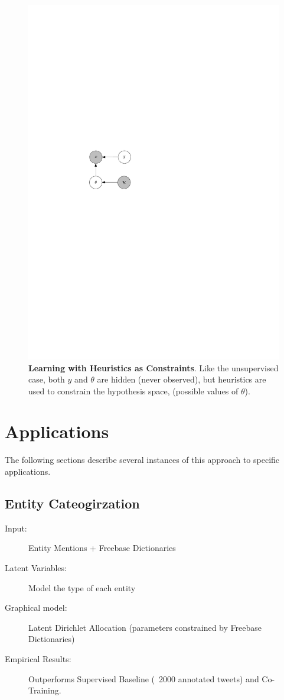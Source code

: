 \documentclass[12pt]{article}
\begin{document}
\begin{figure}
  \centering
  \includegraphics{dlvm_train.pdf}
  \caption{{\bf Learning with Heuristics as Constraints}.  Like the unsupervised case, both $y$ and $\theta$ are hidden (never observed),
  but heuristics are used to constrain the hypothesis space, (possible values of $\theta$).}
  \label{dlvm_train}
\end{figure}


\section{Applications}
The following sections describe several instances of this approach to specific applications.


\subsection{Entity Cateogirzation}
\begin{description}
\item[Input:] Entity Mentions + Freebase Dictionaries
\item[Latent Variables:] Model the type of each entity
\item[Graphical model:] Latent Dirichlet Allocation (parameters constrained by Freebase Dictionaries)
\item[Empirical Results:] Outperforms Supervised Baseline (~2000 annotated tweets) and Co-Training.
\end{description}
\end{document}
